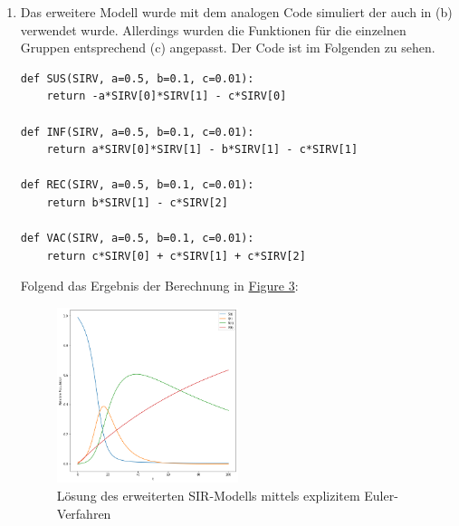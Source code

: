 \documentclass[german]{uebung}
\begin{document}
\begin{exercise}{3}
\begin{enumerate}[label=(\alph*)]
		\item Das erweitere Modell wurde mit dem analogen Code simuliert der auch in (b) verwendet wurde.
			Allerdings wurden die Funktionen f\"ur die einzelnen Gruppen entsprechend (c) angepasst. Der
			Code ist im Folgenden zu sehen.
			
			\begin{lstlisting}[frame=single]
def SUS(SIRV, a=0.5, b=0.1, c=0.01):
    return -a*SIRV[0]*SIRV[1] - c*SIRV[0]

def INF(SIRV, a=0.5, b=0.1, c=0.01):
    return a*SIRV[0]*SIRV[1] - b*SIRV[1] - c*SIRV[1]

def REC(SIRV, a=0.5, b=0.1, c=0.01):
    return b*SIRV[1] - c*SIRV[2]

def VAC(SIRV, a=0.5, b=0.1, c=0.01):
    return c*SIRV[0] + c*SIRV[1] + c*SIRV[2]
			\end{lstlisting}
			
			Folgend das Ergebnis der Berechnung in \hyperref[fig:p3]{Figure 3}:
			\begin{figure}[h!]
				\centering
				\includegraphics[width=0.5\textwidth]{plot3.png}
				\caption{L\"osung des erweiterten SIR-Modells mittels explizitem Euler-Verfahren}
				\label{fig:p3}
			\end{figure}

	\end{enumerate}
\end{exercise}
\;\newpage
\end{document}
